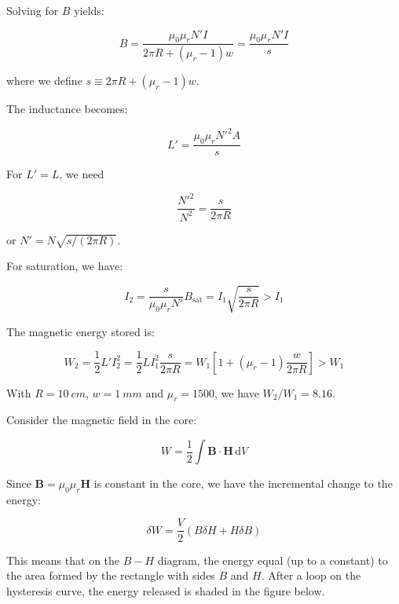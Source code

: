 \documentclass[12pt]{article}
\begin{document}
Solving for $B$ yields:

\begin{equation}
    B = \frac{\mu_{0} \mu_{r} N'I}{2\pi R + (\mu_{r} - 1) w} = \frac{\mu_{0} \mu_{r} N'I}{s}
\end{equation}

where we define $s \equiv 2\pi R + (\mu_{r} - 1) w$.

The inductance becomes:

\begin{equation}
    L' = \frac{\mu_{0} \mu_{r} N'^{2} A}{s}
\end{equation}

For $L' = L$, we need

\begin{equation}
    \frac{N'^{2}}{N^{2}} = \frac{s}{2\pi R}
\end{equation}

or $N' = N \sqrt{s/(2\pi R)}$.

For saturation, we have:

\begin{equation}
    I_{2} = \frac{s}{\mu_{0} \mu_{r} N'} B_{\text{sat}} = I_{1} \sqrt{\frac{s}{2\pi R}} > I_{1}
\end{equation}

The magnetic energy stored is:

\begin{equation}
    W_{2} = \frac{1}{2} L' I_{2}^{2} = \frac{1}{2} L I_{1}^{2} \frac{s}{2\pi R} = W_{1} \left[ 1 + (\mu_{r} - 1) \frac{w}{2\pi R} \right] > W_{1}
\end{equation}

With $R = \qty{10}{cm}$, $w = \qty{1}{mm}$ and $\mu_{r} = 1500$, we have $W_{2}/W_{1} = 8.16$.

Consider the magnetic field in the core:

\begin{equation}
    W = \frac{1}{2} \int \mathbf{B} \cdot \mathbf{H} \, \mathrm{d}V
\end{equation}

Since $\mathbf{B} = \mu_{0} \mu_{r} \mathbf{H}$ is constant in the core, we have the incremental change to the energy:

\begin{equation}
    \delta W = \frac{V}{2} (B \delta H + H \delta B)
\end{equation}

This means that on the $B-H$ diagram, the energy equal (up to a constant) to the area formed by the rectangle with sides $B$ and $H$. After a loop on the hysteresis curve, the energy released is shaded in the figure below.
\end{document}
